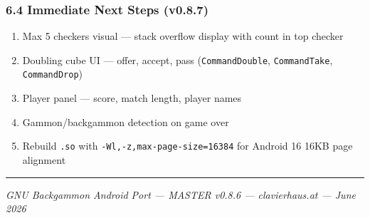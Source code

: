 \documentclass[11pt,a4paper]{article}
\providecommand{\tightlist}{\setlength{\itemsep}{2pt}\setlength{\parskip}{0pt}}
\begin{document}
\subsubsection{6.4 Immediate Next Steps (v0.8.7)}\label{next-steps-v086}

\begin{enumerate}
\def\labelenumi{\arabic{enumi}.}
\tightlist
\item
  Max 5 checkers visual — stack overflow display with count in top checker
\item
  Doubling cube UI — offer, accept, pass (\texttt{CommandDouble},
  \texttt{CommandTake}, \texttt{CommandDrop})
\item
  Player panel — score, match length, player names
\item
  Gammon/backgammon detection on game over
\item
  Rebuild \texttt{.so} with \texttt{-Wl,-z,max-page-size=16384} for
  Android 16 16KB page alignment
\end{enumerate}

\begin{center}\rule{0.5\linewidth}{0.5pt}\end{center}
\emph{GNU Backgammon Android Port --- MASTER v0.8.6 --- clavierhaus.at
--- June 2026}
\end{document}
